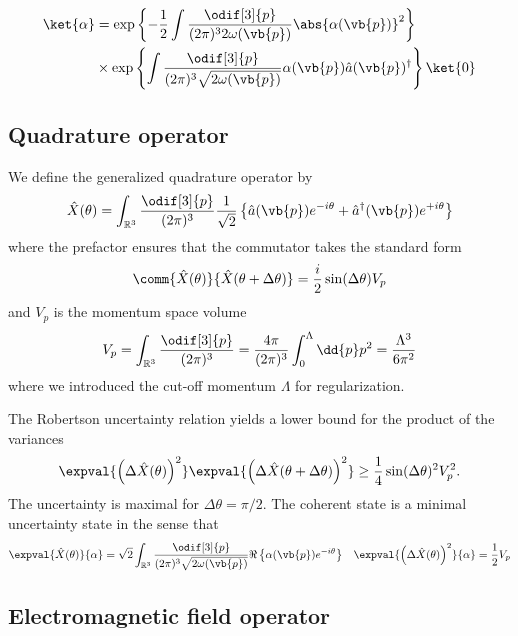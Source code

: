 \begin{equation}
	\begin{split}
		\ket{\alpha}
		&=
		\exp\left\{
			-
			\frac{1}{2}
			\int\frac{\odif[3]{p}}{(2\pi)^32\omega(\vb{p})}
			\abs{\alpha(\vb{p})}^2
		\right\}
		\\
		&\times
		\exp\left\{
			\int\frac{\odif[3]{p}}{(2\pi)^3\sqrt{2\omega(\vb{p})}}
			\alpha(\vb{p})
			\hat{a}(\vb{p})^\dagger
		\right\}
		\ket{0}
	\end{split}
\end{equation}

\subsection{Quadrature operator}

We define the generalized quadrature operator by 
\begin{equation}
	\hat{X}(\theta)
	=
	\int_{\mathbb{R}^3}
	\frac{\odif[3]{p}}{(2\pi)^3}
	\frac{1}{\sqrt{2}}
	\left\{
		\hat{a}(\vb{p})
		e^{-i\theta}
		+
		\hat{a}^\dagger(\vb{p})
		e^{+i\theta}
	\right\}
\end{equation}
where the prefactor ensures that the commutator takes the standard form
\begin{equation}
	\comm{\hat{X}(\theta)}{\hat{X}(\theta+\Delta\theta)}
	=
	\frac{i}{2}
	\sin(\Delta\theta)
	V_p
\end{equation}
and $V_p$ is the momentum space volume
\begin{equation}
	V_p
	=
	\int_{\mathbb{R}^3}\frac{\odif[3]{p}}{(2\pi)^3}
	=
	\frac{4\pi}{(2\pi)^3}
	\int_0^\Lambda\dd{p}p^2
	=
	\frac{\Lambda^3}{6\pi^2}
\end{equation}
where we introduced the cut-off momentum $\Lambda$ for regularization.

The Robertson uncertainty relation yields a lower bound for the product of the variances
\begin{equation}
	\expval{\left(\Delta\hat{X}(\theta)\right)^2}
	\expval{\left(\Delta\hat{X}(\theta+\Delta\theta)\right)^2}
	\geq
	\frac{1}{4}
	\sin(\Delta\theta)^2
	V_p^2
	.
\end{equation}
The uncertainty is maximal for $\Delta\theta=\pi/2$.
The coherent state is a minimal uncertainty state in the sense that
\begin{align}
	\expval{\hat{X}(\theta)}{\alpha}
	=
	\sqrt{2}
	\int_{\mathbb{R}^3}
	\frac{\odif[3]{p}}{(2\pi)^3\sqrt{2\omega(\vb{p})}}
	\Re\left\{
		\alpha(\vb{p})
		e^{-i\theta}
	\right\}
	&&
	\expval{\left(\Delta\hat{X}(\theta)\right)^2}{\alpha}
	=
	\frac{1}{2}
	V_p
\end{align}

\subsection{Electromagnetic field operator}